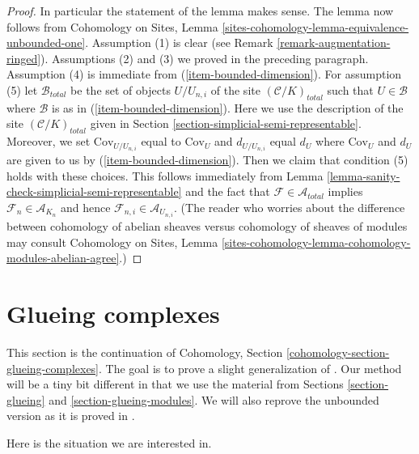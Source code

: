\begin{proof}
\medskip\noindent
In particular the statement of the lemma makes sense.
The lemma now follows from Cohomology on Sites,
Lemma \ref{sites-cohomology-lemma-equivalence-unbounded-one}.
Assumption (1) is clear (see Remark \ref{remark-augmentation-ringed}).
Assumptions (2) and (3) we proved in the preceding paragraph.
Assumption (4) is immediate from (\ref{item-bounded-dimension}).
For assumption (5) let $\mathcal{B}_{total}$ be the set of
objects $U/U_{n, i}$ of the site $(\mathcal{C}/K)_{total}$
such that $U \in \mathcal{B}$ where $\mathcal{B}$ is as in
(\ref{item-bounded-dimension}). Here we use the description of
the site $(\mathcal{C}/K)_{total}$ given in
Section \ref{section-simplicial-semi-representable}.
Moreover, we set $\text{Cov}_{U/U_{n, i}}$ equal to $\text{Cov}_U$
and $d_{U/U_{n, i}}$ equal $d_U$ where $\text{Cov}_U$ and $d_U$
are given to us by (\ref{item-bounded-dimension}).
Then we claim that condition (5) holds with these choices.
This follows immediately from
Lemma \ref{lemma-sanity-check-simplicial-semi-representable}
and the fact that $\mathcal{F} \in \mathcal{A}_{total}$
implies $\mathcal{F}_n \in \mathcal{A}_{K_n}$ and hence
$\mathcal{F}_{n, i} \in \mathcal{A}_{U_{n, i}}$.
(The reader who worries about the difference between
cohomology of abelian sheaves versus cohomology
of sheaves of modules may consult Cohomology on Sites, Lemma
\ref{sites-cohomology-lemma-cohomology-modules-abelian-agree}.)
\end{proof}










\section{Glueing complexes}
\label{section-glueing-complexes}

\noindent
This section is the continuation of
Cohomology, Section \ref{cohomology-section-glueing-complexes}.
The goal is to prove a slight generalization of \cite[Theorem 3.2.4]{BBD}.
Our method will be a tiny bit different in that we use
the material from Sections \ref{section-glueing} and
\ref{section-glueing-modules}. We will also reprove the
unbounded version as it is proved in \cite{six-I}.

\medskip\noindent
Here is the situation we are interested in.

